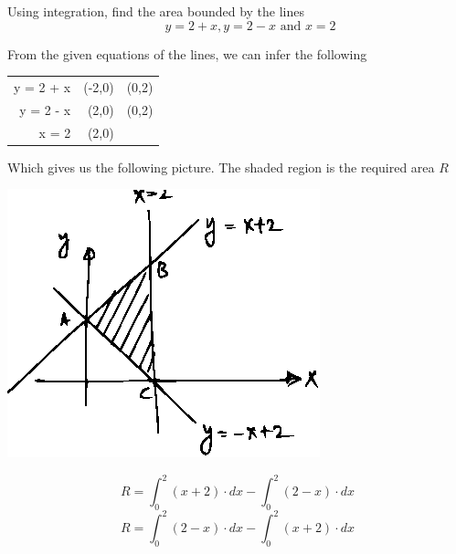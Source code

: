 \documentclass[14pt,fleqn]{extarticle}
\begin{document}
\begin{question}
	\statement 
    
    Using integration, find the area bounded by the lines 
    \[\qquad  y = 2 + x, y = 2 - x\text{ and } x = 2 \]
          
    \begin{step}

	\begin{options}
	\end{options} 
     \reason 
     
     From the given equations of the lines, we can infer the following 
     \begin{center}
  \begin{tabular}{NNN}
   \toprule
        &  &   \\
   \midrule 
   y = 2 + x & (-2,0) & (0,2) \\
    \midrule 
    y = 2 - x & (2,0) & (0,2) \\
    \midrule 
    x = 2 & (2,0) &  \\ 
    \bottomrule
  \end{tabular}
\end{center}

Which gives us the following picture. The shaded region is the required area $R$ 
\begin{center}
\includegraphics[scale=1.4]{figure.eps}
\end{center}
       
\end{step}

\begin{step}
  \begin{options} 
     \correct 
       
       \[ R = \int_0^2 \left(x+2 \right)\cdot dx - \int_0^2 \left(2-x \right)\cdot dx \]
     \incorrect
\[ R = \int_0^2 \left(2-x \right)\cdot dx - \int_0^2 \left(x+2 \right)\cdot dx \]
        

\end{options}
\end{step}
\end{question}
\end{document}
